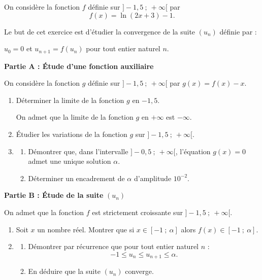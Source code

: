 \medskip

On considère la fonction $f$ définie sur $]-1,5~;~ +\infty[$ par 
\[f(x) = \ln (2x + 3) - 1.\]

Le but de cet exercice est d'étudier la convergence de la suite $\left(u_n\right)$ définie par  :
\begin{center}
$u_0 = 0$ et $u_{n+1}  = f\left(u_n\right)$ pour tout entier naturel $n$.\end{center}

\bigskip

\textbf{Partie A : Étude d'une fonction auxiliaire}

\medskip

On considère la fonction $g$ définie sur $]-1,5~;~ +\infty[$ par $g(x) = f(x) - x$.

\medskip

\begin{enumerate}
\item Déterminer la limite de la fonction $g$ en $-1,5$.

On admet que la limite de la fonction $g$ en $+ \infty$ est $-\infty$.

\item Étudier les variations de la fonction $g$ sur $]-1,5~;~ +\infty[$.
\item 
	\begin{enumerate}
		\item Démontrer que, dans l'intervalle $]-0,5~;~ +\infty[$, l'équation $g(x) = 0$ admet une unique solution $\alpha$.
		\item Déterminer un encadrement de $\alpha$ d'amplitude $10^{-2}$.
	\end{enumerate}	
\end{enumerate}

\bigskip

\textbf{Partie B : Étude de la suite} \boldmath $\left(u_n\right)$\unboldmath

\medskip

On admet que la fonction $f$ est strictement croissante sur $]-1,5~;~ +\infty[$.

\medskip

\begin{enumerate}
\item Soit $x$ un nombre réel. Montrer que si $x \in [-1~;~\alpha]$ alors $f(x) \in  [-1~;~\alpha]$.
\item 
	\begin{enumerate}
		\item Démontrer par récurrence que pour tout entier naturel $n$ :
		\[ -1 \leqslant u_n \leqslant u_{n+1} \leqslant \alpha.\]
		\item En déduire que la suite $\left(u_n\right)$ converge.
	\end{enumerate}	
\end{enumerate}

\bigskip
